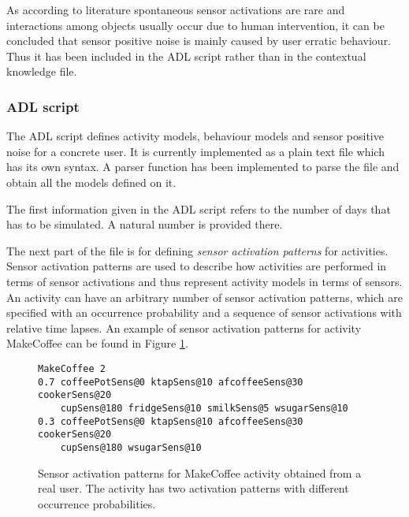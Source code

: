 As according to literature spontaneous sensor activations are rare and interactions among objects usually occur due to human intervention, it can be concluded that sensor positive noise is mainly caused by user erratic behaviour. Thus it has been included in the ADL script rather than in the contextual knowledge file.

\subsubsection*{ADL script}

The ADL script defines activity models, behaviour models and sensor positive noise for a concrete user. It is currently implemented as a plain text file which has its own syntax. A parser function has been implemented to parse the file and obtain all the models defined on it. 

The first information given in the ADL script refers to the number of days that has to be simulated. A natural number is provided there.

The next part of the file is for defining \textit{sensor activation patterns} for activities. Sensor activation patterns are used to describe how activities are performed in terms of sensor activations and thus represent activity models in terms of sensors. An activity can have an arbitrary number of sensor activation patterns, which are specified with an occurrence probability and a sequence of sensor activations with relative time lapses. An example of sensor activation patterns for activity MakeCoffee can be found in Figure \ref{fig:sensor-act}.

\begin{figure}
\begin{small}
\lstset{linewidth=\textwidth}
\begin{lstlisting}
MakeCoffee 2
0.7 coffeePotSens@0 ktapSens@10 afcoffeeSens@30 cookerSens@20 
    cupSens@180 fridgeSens@10 smilkSens@5 wsugarSens@10
0.3 coffeePotSens@0 ktapSens@10 afcoffeeSens@30 cookerSens@20 
    cupSens@180 wsugarSens@10
\end{lstlisting}
\end{small}
\caption{Sensor activation patterns for MakeCoffee activity obtained from a real user. The activity has two activation patterns with different occurrence probabilities.}
\label{fig:sensor-act}
\end{figure}

